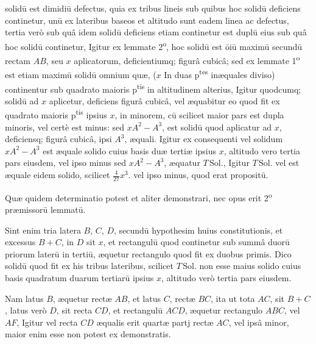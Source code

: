 \documentclass[11pt,a4paper]{article}
\begin{document}

solidū est dimidiū defectus, quia ex tribus lineis sub quibus hoc solidū deficiens continetur, unū ex lateribus baseos et altitudo sunt eadem linea ac defectus, tertia verò sub quâ idem solidū deficiens etiam continetur est duplū eius sub quâ hoc solidū continetur, Igitur ex lemmate 2\textsuperscript{o}, hoc solidū est ōiū maximū secundū rectam $AB$, seu $x$ aplicatorum, deficientiumq; figurâ cubicâ; sed ex lemmate 1\textsuperscript{o} est etiam maximū solidū omnium quæ, ($x$ In duas p\textsuperscript{tes} inæquales diviso) continentur sub quadrato maioris p\textsuperscript{tis} in altitudinem alterius, Igitur quodcumq; solidū ad $x$ aplicetur, deficiens figurâ cubicâ, vel æquabitur eo quod fit ex quadrato maioris p\textsuperscript{tis} ipsius $x$, in minorem, cū scilicet maior pars est dupla minoris, vel certè est minus: sed $xA^{2} - A^{3}$, est solidū quod aplicatur ad $x$, deficiensq; figurâ cubicâ, ipsi $A^{3}$, æquali. Igitur ex consequenti vel solidum $xA^{2} - A^{3}$ est æquale solido cuius basis duæ tertiæ ipsius $x$, altitudo vero tertia pars eiusdem, vel ipso minus sed $xA^{2} - A^{3}$, æquatur $T\,\mathrm{Sol.}$, Igitur $T\,\mathrm{Sol.}$ vel est æquale eidem solido, scilicet $\tfrac{4}{27}x^{3}$. vel ipso minus, quod erat propositū.

Quæ quidem determinatio potest et aliter demonstrari, nec opus erit 2\textsuperscript{o} præmissorū lemmatū.

Sint enim tria latera $B$, $C$, $D$, secundū hypothesim huius constitutionis, et excessus $B + C$, in $D$ sit $x$, et rectangulū quod continetur sub summâ duorū priorum laterū in tertiū, æquetur rectangulo quod fit ex duobus primis. Dico solidū quod fit ex his tribus lateribus, scilicet $T\,\mathrm{Sol.}$ non esse maius solido cuius basis quadratum duarum tertiarū ipsius $x$, altitudo verò tertia pars eiusdem.

Nam latus $B$, æquetur rectæ $AB$, et latus $C$, rectæ $BC$, ita ut tota $AC$, sit $B + C$, latus verò $D$, sit recta $CD$, et rectangulū $ACD$, æquetur rectangulo $ABC$, vel $AF$, Igitur vel recta $CD$ æqualis erit quartæ partj rectæ $AC$, vel ipsâ minor, maior enim esse non potest ex demonstratis.
\end{document}
